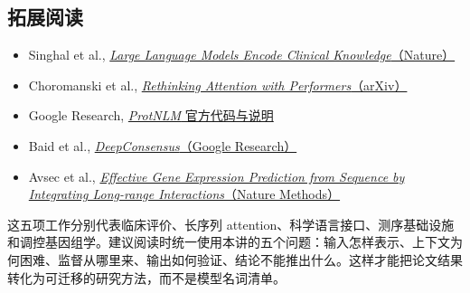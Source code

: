 \subsection{拓展阅读}

\begin{itemize}
  \item Singhal et al., \href{https://www.nature.com/articles/s41586-023-06291-2}{\emph{Large Language Models Encode Clinical Knowledge}（Nature）}
  \item Choromanski et al., \href{https://arxiv.org/abs/2009.14794}{\emph{Rethinking Attention with Performers}（arXiv）}
  \item Google Research, \href{https://github.com/google-research/google-research/tree/master/protnlm}{\emph{ProtNLM} 官方代码与说明}
  \item Baid et al., \href{https://research.google/pubs/deepconsensus-improves-the-accuracy-of-sequences-with-a-gap-aware-sequence-transformer/}{\emph{DeepConsensus}（Google Research）}
  \item Avsec et al., \href{https://www.nature.com/articles/s41592-021-01252-x}{\emph{Effective Gene Expression Prediction from Sequence by Integrating Long-range Interactions}（Nature Methods）}
\end{itemize}

这五项工作分别代表临床评价、长序列 attention、科学语言接口、测序基础设施和调控基因组学。建议阅读时统一使用本讲的五个问题：输入怎样表示、上下文为何困难、监督从哪里来、输出如何验证、结论不能推出什么。这样才能把论文结果转化为可迁移的研究方法，而不是模型名词清单。


